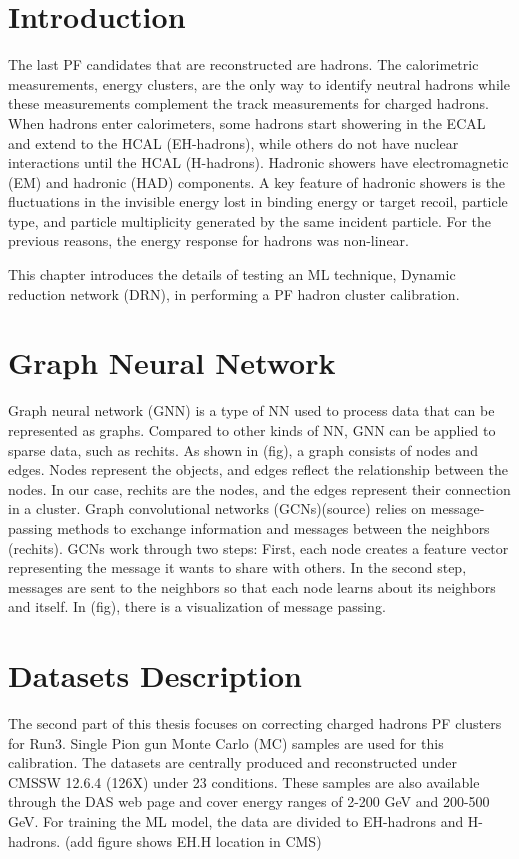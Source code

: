 \section{Introduction}
The last PF candidates that are reconstructed are hadrons. The calorimetric measurements, energy clusters, are the only way to identify neutral hadrons while these measurements complement the track measurements for charged hadrons. When hadrons enter calorimeters, some hadrons start showering in the ECAL and extend to the HCAL (EH-hadrons), while others do not have nuclear interactions until the HCAL (H-hadrons). Hadronic showers have electromagnetic (EM) and hadronic (HAD) components. A key feature of hadronic showers is the fluctuations in the invisible energy lost in binding energy or target recoil, particle type, and particle multiplicity generated by the same incident particle.%
For the previous reasons, the energy response for hadrons was non-linear.    
 
This chapter introduces the details of testing an ML technique, Dynamic reduction network (DRN), in performing a PF hadron cluster calibration.    


\section{Graph Neural Network} %
Graph neural network (GNN) is a type of NN used to process data that can be represented as graphs. Compared to other kinds of NN, GNN can be applied to sparse data, such as rechits.%
As shown in (fig), a graph consists of nodes and edges. Nodes represent the objects, and edges reflect the relationship between the nodes. In our case, rechits are the nodes, and the edges represent their connection in a cluster. Graph convolutional networks (GCNs)(source) relies on message-passing methods to exchange information and messages between the neighbors (rechits). GCNs work through two steps: First, each node creates a feature vector representing the message it wants to share with others. In the second step, messages are sent to the neighbors so that each node learns about its neighbors and itself. In (fig), there is a visualization of message passing.     

\section{Datasets Description}
The second part of this thesis focuses on correcting charged hadrons PF clusters for Run3. Single Pion gun Monte Carlo (MC) samples are used for this calibration. The datasets are centrally produced and reconstructed under CMSSW 12.6.4 (126X) under 23 conditions. These samples are also available through the DAS web page and cover energy ranges of 2-200 GeV and 200-500 GeV. For training the ML model, the data are divided to EH-hadrons and H-hadrons. (add figure shows EH.H location in CMS) 

